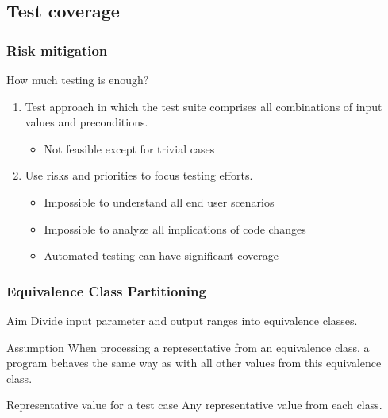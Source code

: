 
\subsection{Test coverage}


\begin{frame}[fragile]
\frametitle{Risk mitigation}
\begin{block}{How much testing is enough?}
\begin{enumerate}[align=parleft]
\item [\small Exhaustive test:] Test approach in which the test suite comprises all combinations of input values and preconditions.
\begin{itemize}
\item \alert{Not feasible} except for trivial cases
\end{itemize}
\item [\small Risk mitigation:] Use risks and \alert{priorities to focus} testing efforts.
\begin{itemize}
\item Impossible to understand all end user scenarios
\item Impossible to analyze all implications of code changes
\item [\small Automation:] Automated testing can have significant coverage
\end{itemize}
\end{enumerate}
\end{block}

\end{frame}


\begin{frame}
\frametitle{Equivalence Class Partitioning}
\begin{block}{Aim}
\alert{Divide} input \alert{parameter} and output  ranges into equivalence classes.
\end{block}
 
\vspace{\baselineskip}
\begin{block}{Assumption}
When processing a representative from an equivalence class, a program \alert{behaves the same way as with all other values} from this equivalence class.
\end{block}
 
\vspace{\baselineskip}
\begin{block}{Representative value for a test case}
Any representative value from each class.
\end{block}
\end{frame}

